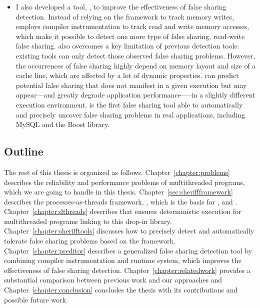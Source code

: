 \begin{itemize}
\item I also developed a tool, \predator{}, to improve the effectiveness of false sharing detection. Instead of relying on the \sheriff{} framework to track memory writes, \predator{} employs compiler instrumentation to track read and write memory accesses, which make it possible to detect one more type of false sharing, read-write false sharing. \Predator{} also overcomes a key limitation of previous detection tools: existing tools can only detect those observed false sharing problems. However, the occurrences of false sharing highly depend on memory layout and size of a cache line, which are affected by a lot of dynamic properties. \Predator{} can predict potential false sharing that does not manifest in a given execution but may appear---and greatly degrade application performance—--in a slightly different execution environment. \Predator{} is the first false sharing tool able to automatically and precisely uncover false sharing problems in real applications, including MySQL and the Boost library.


\end{itemize}

\subsection*{Outline}
The rest of this thesis is organized as follows. Chapter~\ref{chapter:problems} describes the reliability and performance problems of multithreaded programs, which we are going to handle in this thesis. Chapter~\ref{sec:sheriffframework} describes the processes-as-threads framework, \sheriff{}, which is the basis for \dthreads{}, \SheriffDetect{} and \SheriffProtect{}. Chapter~\ref{chapter:dthreads} describes \dthreads{} that ensures deterministic execution for multithreaded programs linking to this drop-in library. Chapter~\ref{chapter:sherifftools} discusses how to precisely detect and automatically tolerate false sharing problems based on the \sheriff{} framework. Chapter~\ref{chapter:preditor} describes a generalized false sharing detection tool by combining compiler instrumentation and runtime system, which improves the effectiveness of false sharing detection. 
Chapter~\ref{chapter:relatedwork} provides a substantial comparison between previous work and our approaches and Chapter~\ref{chapter:conclusion} concludes the thesis with its contributions and possible future work. 




